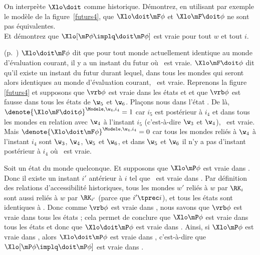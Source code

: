 \begin{exo}\label{exo:mHisto}
On interprète $\Xlo\doit$ comme historique. 
Démontrez, en utilisant par exemple le modèle de la figure~\ref{futurs4}, que $\Xlo\doit\mF\phi$ et $\Xlo\mF\doit\phi$ ne sont pas équivalentes.
\\
Et démontrez que $\Xlo[\mP\phi\implq\doit\mP\phi]$ est vraie pour tout $w$ et tout $i$.
\begin{solu}(p.~\pageref{exo:mHisto})\label{crg:mHisto}
$\Xlo\doit\mF\phi$ dit que pour tout  monde actuellement identique au monde d'évaluation courant, il y a un instant du futur où \vrb\phi\ est vraie. $\Xlo\mF\doit\phi$ dit qu'il existe un instant du futur durant lequel, dans tous les mondes qui seront alors identiques au monde d'évaluation courant, \vrb\phi\ est vraie.  Reprenons la figure  \ref{futurs4} et supposons que $\vrb\phi$ est vraie dans les états  et  et que $\vrb\phi$ est fausse dans tous les états de $\w_5$ et $\w_6$.  Plaçons nous dans l'état .  De là, \(\denote{\Xlo\mF\doit\phi}^{\Modele,\w_4,i_4}=1\) car $i_5$ est postérieur à $i_4$ et dans tous les mondes en relation avec $\w_4$ à l'instant $i_5$ (c'est-à-dire $\w_3$ et $\w_4$), \vrb\phi\ est vraie. Mais \(\denote{\Xlo\doit\mF\phi}^{\Modele,\w_4,i_4}=0\) car tous les mondes reliés à $\w_4$ à l'instant $i_4$ sont $\w_3$, $\w_4$, $\w_5$ et $\w_6$, et dans $\w_5$ et $\w_6$ il n'y a pas d'instant postérieur à $i_4$ où \vrb\phi\ est vraie.

Soit  un état du monde quelconque.  Et supposons que $\Xlo\mP\phi$ est vraie dans .  Donc il existe un instant $i'$ antérieur à $i$ tel que \vrb\phi\ est vraie dans .  Par définition des relations d'accessibilité historiques, tous les mondes $w'$ reliés à $w$ par $\RK_i$ sont aussi reliés à $w$ par $\RK_{i'}$ (parce que $i'\tprec i$), et tous les états  sont identiques à .  Donc comme $\vrb\phi$ est vraie dans , nous savons que $\vrb\phi$ est vraie dans tous les états  ; cela permet de conclure que $\Xlo\mP\phi$ est vraie dans tous les états  et donc que $\Xlo\doit\mP\phi$ est vraie dans . Ainsi, si $\Xlo\mP\phi$ est vraie dans , alors $\Xlo\doit\mP\phi$ est vraie dans , c'est-à-dire que $\Xlo[\mP\phi\implq\doit\mP\phi]$ est vraie dans .

\end{solu}
\end{exo}
